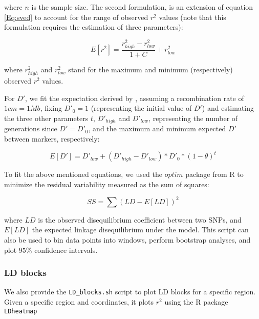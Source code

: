 \documentclass[a4paper]{article}
\begin{document}
\noindent where $n$ is the sample size. The second formulation, is an extension of equation \ref{Eq:sved} to account for the range of observed $r^2$ values (note that this formulation requires the estimation of three parameters):

\vspace{5pt}
\begin{equation}
E[r^2] = \frac{r^2_{high} - r^2_{low}}{1 + C} + r^2_{low}
\label{Eq:sved_ext}
\end{equation}
\vspace{5pt}

\noindent where $r^2_{high}$ and $r^2_{low}$ stand for the maximum and minimum (respectively) observed $r^2$ values.

For $D'$, we fit the expectation derived by \cite{Abecasis2001}, assuming a recombination rate of $1cm = 1Mb$, fixing $D'_0 = 1$ (representing the initial value of $D'$) and estimating the three other parameters $t$, $D'_{high}$ and $D'_{low}$, representing the number of generations since $D'=D'_0$, and the maximum and minimum expected $D'$ between markers, respectively:

\vspace{5pt}
\begin{equation}
E[D'] = D'_{low} + (D'_{high} - D'_{low}) * D'_0 * (1 - \theta) ^ t
\label{Eq:abecassis}
\end{equation}
\vspace{5pt}

To fit the above mentioned equations, we used the $optim$ package from R to minimize the residual variability measured as the sum of squares:

\vspace{5pt}
\begin{equation}
SS = \sum (LD - E[LD]) ^ 2
\label{Eq:fit}
\end{equation}
\vspace{5pt}

\noindent where $LD$ is the observed disequilibrium coefficient between two SNPs, and $E[LD]$ the expected linkage disequilibrium under the model. This script can also be used to bin data points into windows, perform bootstrap analyses, and plot $95\%$ confidence intervals.

\subsubsection{LD blocks}
We also provide the \verb|LD_blocks.sh| script to plot LD blocks for a specific region. Given a specific region and coordinates, it plots $r^2$ using the R package \verb|LDheatmap| \citep{Shin2006}
\end{document}
